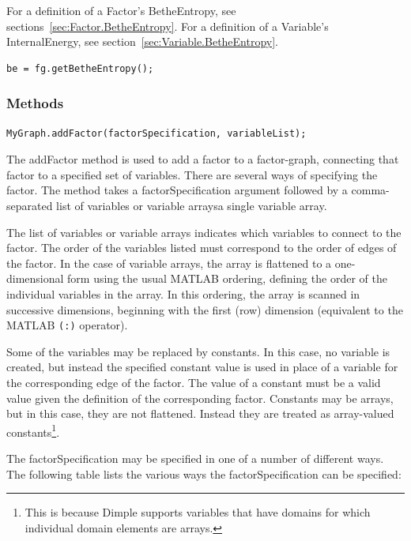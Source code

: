 For a definition of a Factor's BetheEntropy, see sections~\ref{sec:Factor.BetheEntropy}.  For a definition of a Variable's InternalEnergy, see section~\ref{sec:Variable.BetheEntropy}.

\ifjava
\begin{lstlisting}
be = fg.getBetheEntropy();
\end{lstlisting}
\fi


\subsubsection{Methods}

\label{sec:FactorGraph.addFactor}

\begin{lstlisting}
MyGraph.addFactor(factorSpecification, variableList);
\end{lstlisting}

The addFactor method is used to add a factor to a factor-graph, connecting that factor to a specified set of variables. There are several ways of specifying the factor.  The method takes a factorSpecification argument followed by a comma-separated list of variables or \ifmatlab variable arrays\fi \ifjava a single variable array\fi.

The list of variables \ifmatlab or variable arrays \fi indicates which variables to connect to the factor.  The order of the variables listed must correspond to the order of edges of the factor.  \ifmatlab  In the case of variable arrays, the array is flattened to a one-dimensional form using the usual MATLAB ordering, defining the order of the individual variables in the array.  In this ordering, the array is scanned in successive dimensions, beginning with the first (row) dimension (equivalent to the MATLAB \texttt{(:)} operator). \fi

Some of the variables may be replaced by constants.  In this case, no variable is created, but instead the specified constant value is used in place of a variable for the corresponding edge of the factor.  The value of a constant must be a valid value given the definition of the corresponding factor.  \ifmatlab Constants may be arrays, but in this case, they are not flattened.  Instead they are treated as array-valued constants\footnote{This is because Dimple supports variables that have domains for which individual domain elements are arrays.}.  \fi

The factorSpecification may be specified in one of a number of different ways.  The following table lists the various ways the factorSpecification can be specified:

